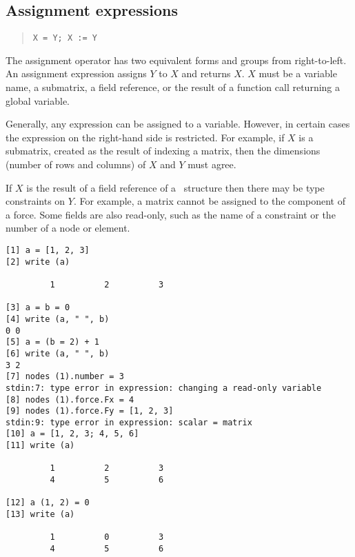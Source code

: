 \subsection{Assignment expressions}
\label{burlap.op.assignment}

\begin{quote}
\begin{verbatim}
X = Y; X := Y
\end{verbatim}
\end{quote}

The assignment operator has two equivalent forms and groups from
right-to-left.  An assignment expression assigns $Y$ to $X$ and
returns $X$.  $X$ must be a variable name, a submatrix, a field
reference, or the result of a function call returning a global
variable.

Generally, any expression can be assigned to a variable.  However, in
certain cases the expression on the right-hand side is restricted.
For example, if $X$ is a submatrix, created as the result of indexing
a matrix, then the dimensions (number of rows and columns) of $X$ and
$Y$ must agree.

If $X$ is the result of a field reference of a \felt\ structure then
there may be type constraints on $Y$.  For example, a matrix cannot be
assigned to the component of a force.  Some fields are also read-only,
such as the name of a constraint or the number of a node or element.

\begin{screen}
\begin{verbatim}
[1] a = [1, 2, 3]
[2] write (a)

         1          2          3 

[3] a = b = 0
[4] write (a, " ", b)
0 0
[5] a = (b = 2) + 1
[6] write (a, " ", b)
3 2
[7] nodes (1).number = 3
stdin:7: type error in expression: changing a read-only variable
[8] nodes (1).force.Fx = 4
[9] nodes (1).force.Fy = [1, 2, 3]
stdin:9: type error in expression: scalar = matrix
[10] a = [1, 2, 3; 4, 5, 6]
[11] write (a)

         1          2          3 
         4          5          6 

[12] a (1, 2) = 0
[13] write (a)

         1          0          3 
         4          5          6 
\end{verbatim}
\end{screen}


